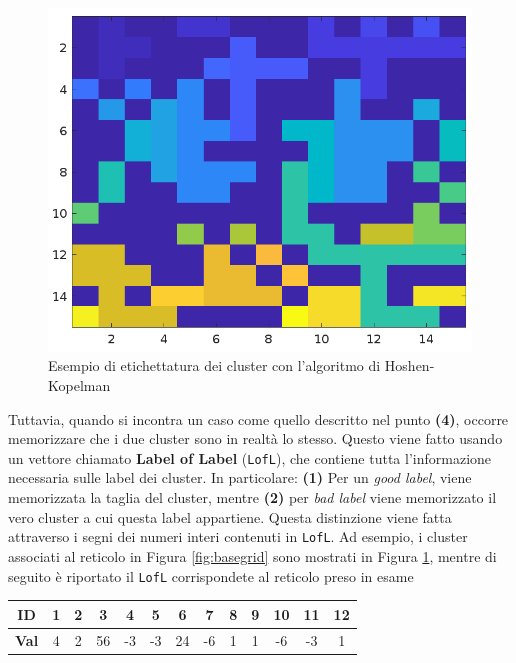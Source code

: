 \begin{figure}[H]
\begin{minipage}{0.45\textwidth}
		\includegraphics[width=\linewidth]{images/labels}
		
	\end{minipage}
	\caption{Esempio di etichettatura dei cluster con l’algoritmo di Hoshen-Kopelman}
	\label{fig:clustered}
\end{figure}
\noindent
Tuttavia, quando si incontra un caso come quello descritto nel punto \textbf{(4)}, occorre  memorizzare che i due cluster sono in realtà lo stesso. Questo viene fatto usando un vettore chiamato \textbf{Label of Label} (\texttt{LofL}), che contiene tutta l’informazione necessaria sulle label dei cluster. In particolare: 
\textbf{(1)} Per un \textit{good label}, viene memorizzata la taglia del cluster, mentre \textbf{(2)} per \textit{bad label} viene memorizzato il vero cluster a cui questa label appartiene.  Questa distinzione viene fatta attraverso i segni dei numeri interi contenuti in \texttt{LofL}. Ad esempio, i cluster associati al reticolo in Figura \ref{fig:basegrid} sono mostrati in Figura \ref{fig:clustered}, mentre di seguito è riportato il \texttt{LofL} corrispondete al reticolo preso in esame

\vspace{15px}
\noindent
\begin{tabular}{|c|*{12}{c|}}
	\hline
	\textbf{ID}   & 1 & 2 & 3 & 4 & 5 & 6 & 7 & 8 & 9 & 10 & 11 & 12 \\
	\hline
	\textbf{Val}  & 4 & 2 & 56 & -3 & -3 & 24 & -6 & 1 & 1 & -6 & -3 & 1 \\
	\hline
\end{tabular}

